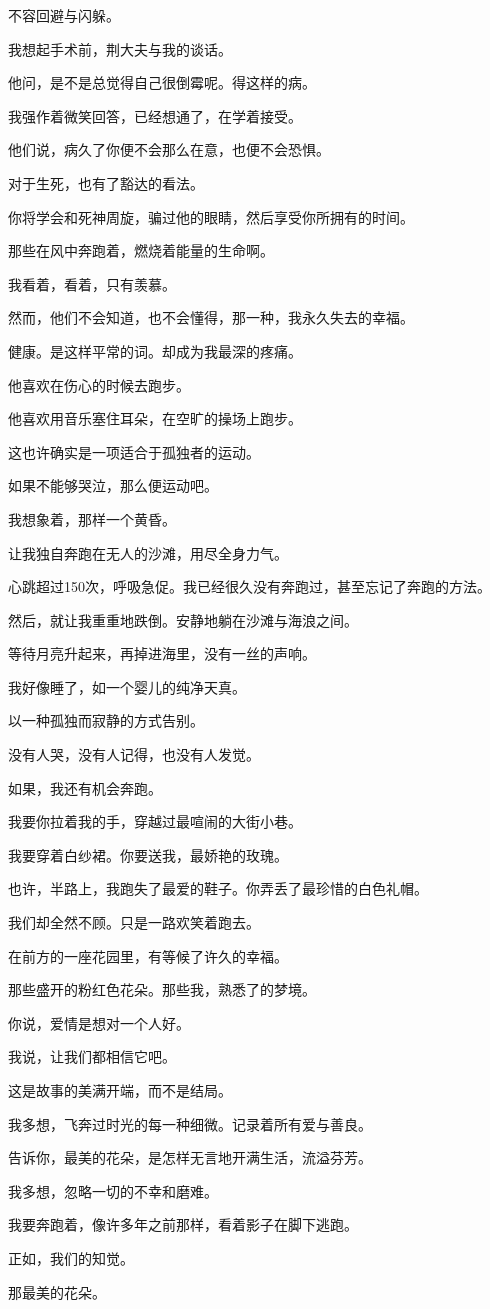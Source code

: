		不容回避与闪躲。\par
		我想起手术前，荆大夫与我的谈话。\par
		他问，是不是总觉得自己很倒霉呢。得这样的病。\par
		我强作着微笑回答，已经想通了，在学着接受。\par
		他们说，病久了你便不会那么在意，也便不会恐惧。\par
		对于生死，也有了豁达的看法。\par
		你将学会和死神周旋，骗过他的眼睛，然后享受你所拥有的时间。\par
		那些在风中奔跑着，燃烧着能量的生命啊。\par
		我看着，看着，只有羡慕。\par
		然而，他们不会知道，也不会懂得，那一种，我永久失去的幸福。\par
		健康。是这样平常的词。却成为我最深的疼痛。\par
		他喜欢在伤心的时候去跑步。\par
		他喜欢用音乐塞住耳朵，在空旷的操场上跑步。\par
		这也许确实是一项适合于孤独者的运动。\par
		如果不能够哭泣，那么便运动吧。\par
		我想象着，那样一个黄昏。\par
		让我独自奔跑在无人的沙滩，用尽全身力气。\par
		心跳超过150次，呼吸急促。我已经很久没有奔跑过，甚至忘记了奔跑的方法。\par
		然后，就让我重重地跌倒。安静地躺在沙滩与海浪之间。\par
		等待月亮升起来，再掉进海里，没有一丝的声响。\par
		我好像睡了，如一个婴儿的纯净天真。\par
		以一种孤独而寂静的方式告别。\par
		没有人哭，没有人记得，也没有人发觉。\par
		如果，我还有机会奔跑。\par
		我要你拉着我的手，穿越过最喧闹的大街小巷。\par
		我要穿着白纱裙。你要送我，最娇艳的玫瑰。\par
		也许，半路上，我跑失了最爱的鞋子。你弄丢了最珍惜的白色礼帽。\par
		我们却全然不顾。只是一路欢笑着跑去。\par
		在前方的一座花园里，有等候了许久的幸福。\par
		那些盛开的粉红色花朵。那些我，熟悉了的梦境。\par
		你说，爱情是想对一个人好。\par
		我说，让我们都相信它吧。\par
		这是故事的美满开端，而不是结局。\par
		我多想，飞奔过时光的每一种细微。记录着所有爱与善良。\par
		告诉你，最美的花朵，是怎样无言地开满生活，流溢芬芳。\par
		我多想，忽略一切的不幸和磨难。\par
		我要奔跑着，像许多年之前那样，看着影子在脚下逃跑。\par
		正如，我们的知觉。\par
		那最美的花朵。

